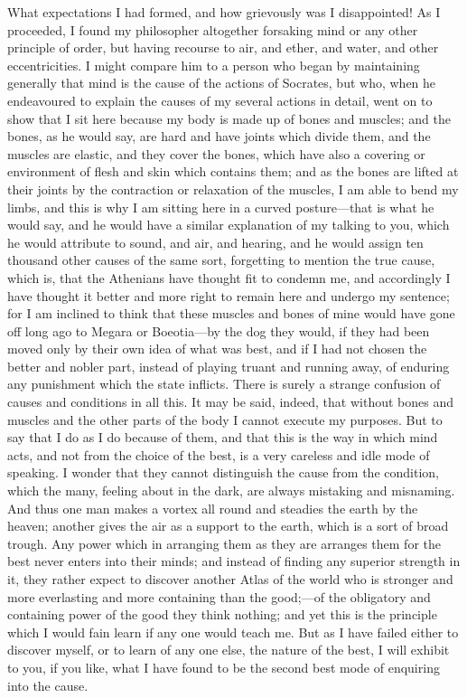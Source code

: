 What expectations I had formed, and how grievously was I disappointed! As
I proceeded, I found my philosopher altogether forsaking mind or any other
principle of order, but having recourse to air, and ether, and water, and
other eccentricities. I might compare him to a person who began by
maintaining generally that mind is the cause of the actions of Socrates,
but who, when he endeavoured to explain the causes of my several actions
in detail, went on to show that I sit here because my body is made up of
bones and muscles; and the bones, as he would say, are hard and have
joints which divide them, and the muscles are elastic, and they cover the
bones, which have also a covering or environment of flesh and skin which
contains them; and as the bones are lifted at their joints by the
contraction or relaxation of the muscles, I am able to bend my limbs, and
this is why I am sitting here in a curved posture—that is what he
would say, and he would have a similar explanation of my talking to you,
which he would attribute to sound, and air, and hearing, and he would
assign ten thousand other causes of the same sort, forgetting to mention
the true cause, which is, that the Athenians have thought fit to condemn
me, and accordingly I have thought it better and more right to remain here
and undergo my sentence; for I am inclined to think that these muscles and
bones of mine would have gone off long ago to Megara or Boeotia—by
the dog they would, if they had been moved only by their own idea of what
was best, and if I had not chosen the better and nobler part, instead of
playing truant and running away, of enduring any punishment which the
state inflicts. There is surely a strange confusion of causes and
conditions in all this. It may be said, indeed, that without bones and
muscles and the other parts of the body I cannot execute my purposes. But
to say that I do as I do because of them, and that this is the way in
which mind acts, and not from the choice of the best, is a very careless
and idle mode of speaking. I wonder that they cannot distinguish the cause
from the condition, which the many, feeling about in the dark, are always
mistaking and misnaming. And thus one man makes a vortex all round and
steadies the earth by the heaven; another gives the air as a support to
the earth, which is a sort of broad trough. Any power which in arranging
them as they are arranges them for the best never enters into their minds;
and instead of finding any superior strength in it, they rather expect to
discover another Atlas of the world who is stronger and more everlasting
and more containing than the good;—of the obligatory and containing
power of the good they think nothing; and yet this is the principle which
I would fain learn if any one would teach me. But as I have failed either
to discover myself, or to learn of any one else, the nature of the best, I
will exhibit to you, if you like, what I have found to be the second best
mode of enquiring into the cause.


